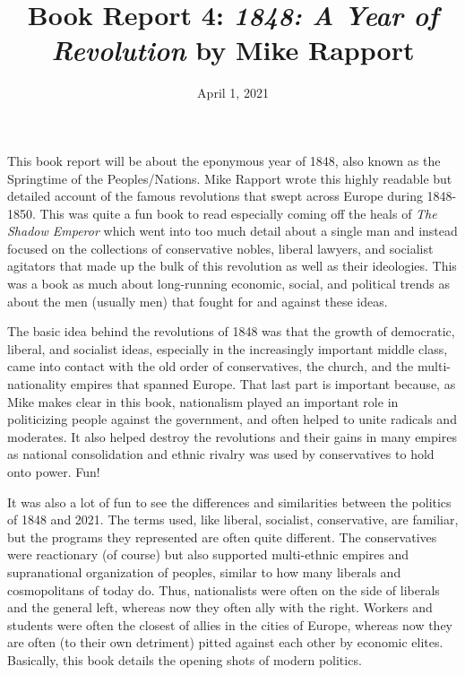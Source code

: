 \documentclass[12pt]{article}
\title{\vspace{-20mm} \textbf{Book Report 4: \emph{1848: A Year of Revolution} by Mike Rapport}}
\begin{document}
\date{April 1, 2021}
\maketitle
\thispagestyle{empty} %

This book report will be about the eponymous year of 1848, also known as the Springtime of the Peoples/Nations. Mike Rapport wrote this highly readable but detailed account of the famous revolutions that swept across Europe during 1848-1850. This was quite a fun book to read especially coming off the heals of \emph{The Shadow Emperor} which went into too much detail about a single man and instead focused on the collections of conservative nobles, liberal lawyers, and socialist agitators that made up the bulk of this revolution as well as their ideologies. This was a book as much about long-running economic, social, and political trends as about the men (usually men) that fought for and against these ideas.

\vspace{5mm}

The basic idea behind the revolutions of 1848 was that the growth of democratic, liberal, and socialist ideas, especially in the increasingly important middle class, came into contact with the old order of conservatives, the church, and the multi-nationality empires that spanned Europe. That last part is important because, as Mike makes clear in this book, nationalism played an important role in politicizing people against the government, and often helped to unite radicals and moderates. It also helped destroy the revolutions and their gains in many empires as national consolidation and ethnic rivalry was used by conservatives to hold onto power. Fun!

\vspace{5mm}

It was also a lot of fun to see the differences and similarities between the politics of 1848 and 2021. The terms used, like liberal, socialist, conservative, are familiar, but the programs they represented are often quite different. The conservatives were reactionary (of course) but also supported multi-ethnic empires and supranational organization of peoples, similar to how many liberals and cosmopolitans of today do. Thus, nationalists were often on the side of liberals and the general left, whereas now they often ally with the right. Workers and students were often the closest of allies in the cities of Europe, whereas now they are often (to their own detriment) pitted against each other by economic elites. Basically, this book details the opening shots of modern politics.
\end{document}
